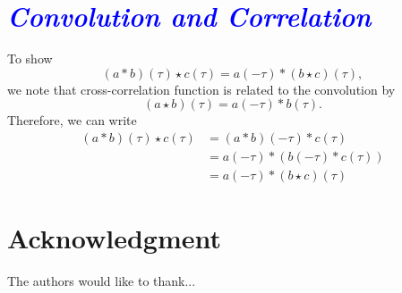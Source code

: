 \documentclass[conference]{IEEEtran}
\newcommand{\parham}[1]{\textsf{\emph{\textbf{\textcolor{blue}{#1}}}}}
\begin{document}
\section*{\parham{Convolution and Correlation}}
To show 
\begin{equation}
 \left(a \ast b \right)\left(\tau\right)  \star c\left(\tau\right)  = a\left(-\tau\right)\ast\left(b \star c\right)\left(\tau\right),
\end{equation}
we note that cross-correlation function is related to the convolution by \cite{Yarlagadda2009}
\begin{equation}
 \left(a \star b\right)\left(\tau\right)= a\left(-\tau \right)\ast b\left(\tau\right).
\end{equation}
Therefore, we can write
\begin{align}
 \left(a \ast b\right)\left(\tau\right) \star c\left(\tau\right)&= \left(a \ast b\right)\left(-\tau \right)\ast c\left(\tau\right) \nonumber \\
&=a\left(-\tau\right)\ast \left(b\left(-\tau\right) \ast c\left(\tau\right)\right)\nonumber \\
&=a\left(-\tau\right)\ast\left(b\star c\right)\left(\tau\right)
\end{align}



\section*{Acknowledgment}


The authors would like to thank...









\end{document}

